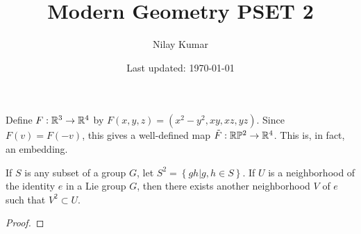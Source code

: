 \documentclass{../../mathnotes}
\title{Modern Geometry PSET 2}
\author{Nilay Kumar}
\date{Last updated: \today}
\begin{document}
\maketitle

\begin{prop}
    Define $F:\mathbb{R}^3\to\mathbb{R}^4$ by $F(x,y,z)=(x^2-y^2,xy,xz,yz)$. Since $F(v)=F(-v)$, this gives a well-defined map $\tilde F:\mathbb{R}\mathbb{P}^2\to\mathbb{R}^4$.
    This is, in fact, an embedding.
\end{prop}

\begin{prop}
    If $S$ is any subset of a group $G$, let $S^2=\left\{ gh | g,h\in S \right\}$. If $U$ is a neighborhood of the identity $e$ in a Lie group $G$, then
    there exists another neighborhood $V$ of $e$ such that $V^2\subset U$.
\end{prop}
\begin{proof}
    
\end{proof}
\end{document}
